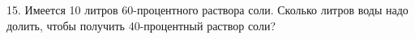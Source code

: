 15. Имеется 10 литров 60-процентного раствора соли. Сколько литров воды надо долить, чтобы получить 40-процентный раствор соли?\\
